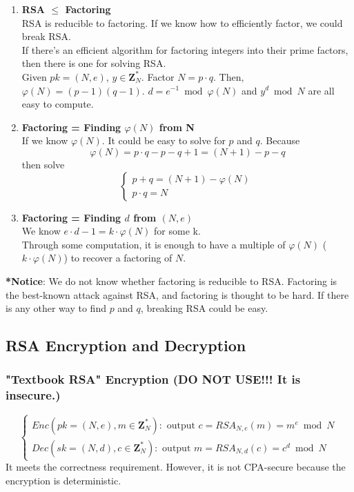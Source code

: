 \documentclass{scribe}
\begin{document}
\begin{enumerate}
    \item \textbf{RSA $\le$ Factoring}\\
            RSA is reducible to factoring. If we know how to efficiently factor, we could break RSA.\\
            If there's an efficient algorithm for factoring integers into their prime factors, then there is one for solving RSA.\\
            Given $pk = (N,e)$, $y \in \mathbf{Z}_N^*$. Factor $N=p \cdot q$. Then, $\varphi(N) = (p-1)(q-1)$. $d = e^{-1} \bmod \varphi(N)$ and $y^d \bmod N$ are all easy to compute.
    \item \textbf{Factoring = Finding $\varphi(N)$ from N}\\
            If we know $\varphi(N)$. It could be easy to solve for $p$ and $q$. Because
            \[\varphi(N) = p \cdot q - p - q +1 = (N+1) -p - q \]
            then solve 
            \begin{equation*}
                \begin{cases}
                  p+q = (N+1) - \varphi(N)\\
                  p \cdot q = N
                \end{cases}\,
            \end{equation*}
    \item \textbf{Factoring = Finding $d$ from $(N,e)$}\\
            We know $e \cdot d - 1 = k \cdot \varphi(N)$ for some k.\\
            Through some computation, it is enough to have a multiple of $\varphi(N)$ ($k \cdot \varphi(N)$) to recover a factoring of $N$.
\end{enumerate}
\textbf{*Notice}: We do not know whether factoring is reducible to RSA. Factoring is the best-known attack against RSA, and factoring is thought to be hard. If there is any other way to find $p$ and $q$, breaking RSA could be easy.
\vspace{5mm}
\subsection{RSA Encryption and Decryption}
\subsubsection{"Textbook RSA" Encryption (DO NOT USE!!! It is insecure.)}
\begin{equation*}
    \begin{cases}
      Enc(pk = (N, e), m \in \mathbf{Z}_N^*): \text{ output } c= RSA_{N,e}(m) = m^e \bmod N \\
      Dec(sk = (N, d), c \in \mathbf{Z}_N^*): \text{ output } m = RSA_{N,d}(c) = c^d \bmod N
    \end{cases}\,
\end{equation*}
It meets the correctness requirement. However, it is not CPA-secure because the encryption is deterministic.
\end{document}
